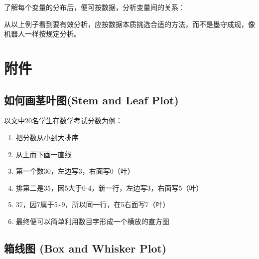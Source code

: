 了解每个变量的分布后，便可按数据，分析变量间的关系：





从以上例子看到要有效分析，应按数据本质挑选合适的方法，而不是墨守成规，像机器人一样按规定分析。

\hypertarget{ux9644ux4ef6}{%
\section{附件}\label{ux9644ux4ef6}}

\hypertarget{ux5982ux4f55ux753bux830eux53f6ux56festem-and-leaf-plot}{%
\subsection{如何画茎叶图(Stem and Leaf
Plot)}\label{ux5982ux4f55ux753bux830eux53f6ux56festem-and-leaf-plot}}

以文中20名学生在数学考试分数为例：

\begin{enumerate}
\tightlist
\item
  把分数从小到大排序
\item
  从上而下画一直线
\item
  第一个数30，左边写3，右面写0（叶）
\item
  排第二是35，因5大于0-4，新一行，左边写3，右面写5（叶）
\item
  37，因7属于5\textasciitilde{}9，所以同一行，在5右面写7（叶）
\item
  最终便可以简单利用数目字形成一个横放的直方图
\end{enumerate}

\hypertarget{ux7bb1ux7ebfux56fe-box-and-whisker-plot}{%
\subsection{箱线图 (Box and Whisker
Plot)}\label{ux7bb1ux7ebfux56fe-box-and-whisker-plot}}

